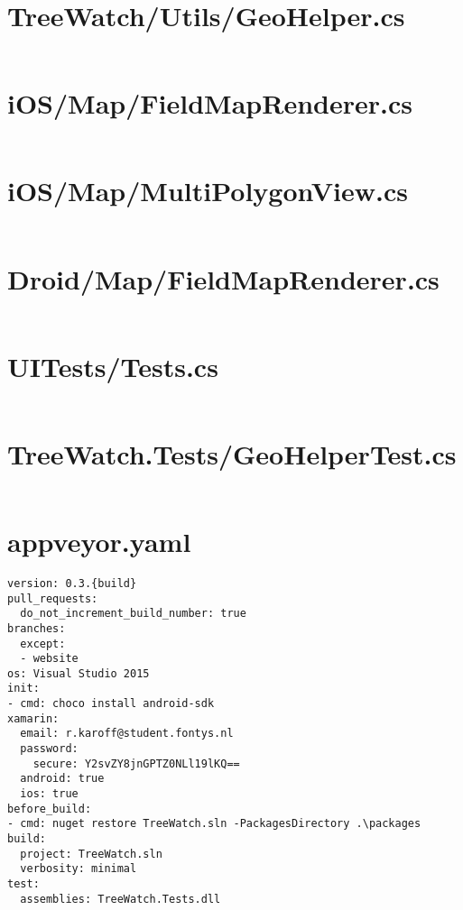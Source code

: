 \documentclass[12pt]{article}
\begin{document}
\section{TreeWatch/Utils/GeoHelper.cs}
\inputminted[linenos,firstline=22]{csharp}{../../../src/TreeWatch/Utils/GeoHelper.cs}

\section{iOS/Map/FieldMapRenderer.cs}
\inputminted[linenos,firstline=22]{csharp}{../../../src/iOS/Map/FieldMapRenderer.cs}


\section{iOS/Map/MultiPolygonView.cs}
\inputminted[linenos,firstline=22]{csharp}{../../../src/iOS/Map/MultiPolygonView.cs}

\section{Droid/Map/FieldMapRenderer.cs}
\inputminted[linenos,firstline=22]{csharp}{../../../src/Droid/Map/FieldMapRenderer.cs}

\section{UITests/Tests.cs}
\inputminted[linenos,firstline=22]{csharp}{../../../src/UITests/Tests.cs}

\section{TreeWatch.Tests/GeoHelperTest.cs}
\inputminted[linenos,firstline=22]{csharp}{../../../src/TreeWatch.Tests/GeoHelperTest.cs}

\section{appveyor.yaml}
\begin{verbatim}
version: 0.3.{build}
pull_requests:
  do_not_increment_build_number: true
branches:
  except:
  - website
os: Visual Studio 2015
init:
- cmd: choco install android-sdk
xamarin:
  email: r.karoff@student.fontys.nl
  password:
    secure: Y2svZY8jnGPTZ0NLl19lKQ==
  android: true
  ios: true
before_build:
- cmd: nuget restore TreeWatch.sln -PackagesDirectory .\packages
build:
  project: TreeWatch.sln
  verbosity: minimal
test:
  assemblies: TreeWatch.Tests.dll
\end{verbatim}
\end{document}
